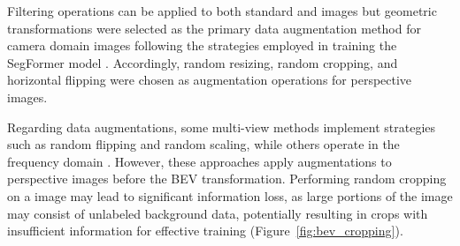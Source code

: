 Filtering operations can be applied to both standard and  images but geometric transformations were selected as the primary data augmentation method for camera domain images following the strategies employed in training the SegFormer model \cite{segformer}. Accordingly, random resizing, random cropping, and horizontal flipping were chosen as augmentation operations for perspective images.

Regarding  data augmentations, some multi-view methods implement strategies such as random flipping and random scaling, while others operate in the frequency domain \cite{HSDA}. However, these approaches apply augmentations to perspective images before the BEV transformation. Performing random cropping on a  image may lead to significant information loss, as large portions of the image may consist of unlabeled background data, potentially resulting in crops with insufficient information for effective training (Figure~\ref{fig:bev_cropping}). 

